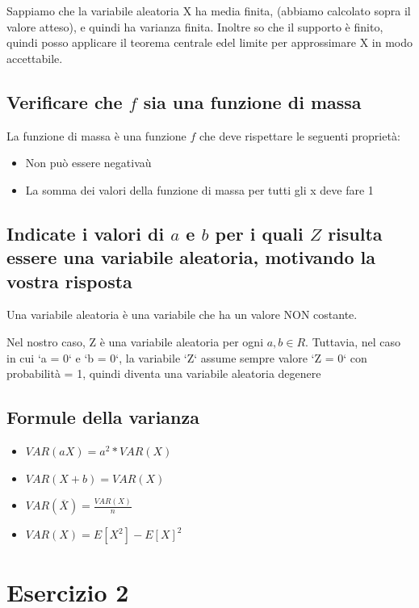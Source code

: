 \documentclass{article}
\begin{document}
Sappiamo che la variabile aleatoria X ha media finita, (abbiamo calcolato sopra il valore atteso), e quindi ha varianza finita. Inoltre so che il supporto è finito, quindi posso applicare il teorema centrale edel limite per approssimare X in modo accettabile.

\subsection*{Verificare che $f$ sia una funzione di massa}

La funzione di massa è una funzione $f$ che deve rispettare le seguenti proprietà:

\begin{itemize}
    \item Non può essere negativaù
    \item La somma dei valori della funzione di massa per tutti gli x deve fare 1
\end{itemize}
\subsection*{Indicate i valori di $a$ e $b$ per i quali $Z$ risulta essere una variabile aleatoria, motivando la vostra risposta}

Una variabile aleatoria è una variabile che ha un valore NON costante.

Nel nostro caso, Z è una variabile aleatoria per ogni $a, b \in R$. Tuttavia, nel caso in cui `a = 0` e `b = 0`, la variabile `Z` assume sempre valore `Z = 0` con probabilità = 1, quindi diventa una variabile aleatoria degenere

\subsection*{Formule della varianza}

\begin{itemize}
    \item $VAR(aX) = a^2* VAR(X)$
    \item $VAR(X + b) = VAR(X)$
    \item $VAR(\overline {X}) = \frac{VAR(X)}{n}$
    \item $VAR(X) = E[X^2] - E[X]^2$
\end{itemize}

\section{Esercizio 2}
\end{document}
